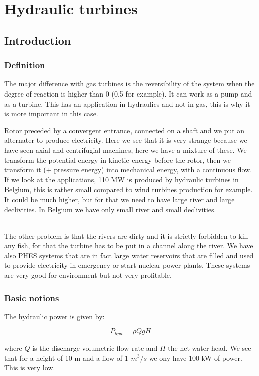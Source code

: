 
\chapter{Hydraulic turbines}
\section{Introduction}
\subsection{Definition}
The major difference with gas turbines is the reversibility of the system when the degree of reaction is higher than 0 (0.5 for example). It can work as a pump and as a turbine. This has an application in hydraulics and not in gas, this is why it is more important in this case. 

Rotor preceded by a convergent entrance, connected on a shaft and we put an alternater to produce electricity. Here we see that it is very strange because we have seen axial and centrifugial machines, here we have a mixture of these. We transform the potential energy in kinetic energy before the rotor, then we transform it (+ pressure energy) into mechanical energy, with a continuous flow. If we look at the applications, 110 MW is produced by hydraulic turbines in Belgium, this is rather small compared to wind turbines production for example. It could be much higher, but for that we need to have large river and large declivities. In Belgium we have only small river and small declivities. 

\ \\
The other problem is that the rivers are dirty and it is strictly forbidden to kill any fish, for that the turbine has to be put in a channel along the river. We have also PHES systems that are in fact large water reservoirs that are filled and used to provide electricity in emergency or start nuclear power plants. 
These systems are very good for environment but not very profitable. 

\subsection{Basic notions}
The hydraulic power is given by: 

\begin{equation}
P_{hyd} = \rho Q g H
\end{equation}

where $Q$ is the discharge volumetric flow rate and $H$ the net water head. We see that for a height of 10 m and a flow of 1 $m^3/s$ we ony have 100 kW of power. This is very low. 

